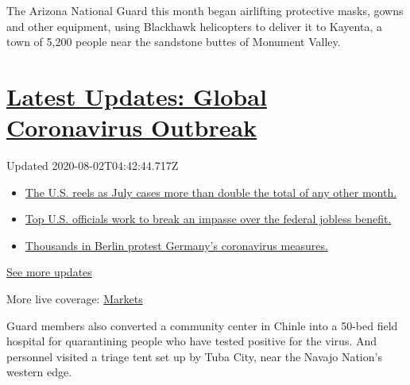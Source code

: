 The Arizona National Guard this month began airlifting protective masks,
gowns and other equipment, using Blackhawk helicopters to deliver it to
Kayenta, a town of 5,200 people near the sandstone buttes of Monument
Valley.

\hypertarget{latest-updates-global-coronavirus-outbreak}{%
\section{\texorpdfstring{\href{https://www.nytimes.com/2020/08/01/world/coronavirus-covid-19.html?action=click\&pgtype=Article\&state=default\&region=MAIN_CONTENT_1\&context=storylines_live_updates}{Latest
Updates: Global Coronavirus
Outbreak}}{Latest Updates: Global Coronavirus Outbreak}}\label{latest-updates-global-coronavirus-outbreak}}

Updated 2020-08-02T04:42:44.717Z

\begin{itemize}
\tightlist
\item
  \href{https://www.nytimes.com/2020/08/01/world/coronavirus-covid-19.html?action=click\&pgtype=Article\&state=default\&region=MAIN_CONTENT_1\&context=storylines_live_updates\#link-34047410}{The
  U.S. reels as July cases more than double the total of any other
  month.}
\item
  \href{https://www.nytimes.com/2020/08/01/world/coronavirus-covid-19.html?action=click\&pgtype=Article\&state=default\&region=MAIN_CONTENT_1\&context=storylines_live_updates\#link-780ec966}{Top
  U.S. officials work to break an impasse over the federal jobless
  benefit.}
\item
  \href{https://www.nytimes.com/2020/08/01/world/coronavirus-covid-19.html?action=click\&pgtype=Article\&state=default\&region=MAIN_CONTENT_1\&context=storylines_live_updates\#link-25930521}{Thousands
  in Berlin protest Germany's coronavirus measures.}
\end{itemize}

\href{https://www.nytimes.com/2020/08/01/world/coronavirus-covid-19.html?action=click\&pgtype=Article\&state=default\&region=MAIN_CONTENT_1\&context=storylines_live_updates}{See
more updates}

More live coverage:
\href{https://www.nytimes.com/live/2020/07/31/business/stock-market-today-coronavirus?action=click\&pgtype=Article\&state=default\&region=MAIN_CONTENT_1\&context=storylines_live_updates}{Markets}

Guard members also converted a community center in Chinle into a 50-bed
field hospital for quarantining people who have tested positive for the
virus. And personnel visited a triage tent set up by Tuba City, near the
Navajo Nation's western edge.

